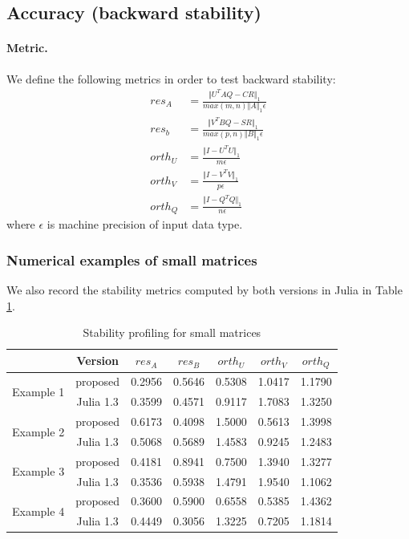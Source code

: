     \subsection{Accuracy (backward stability)}
    \paragraph{Metric.}
    We define the following metrics in order to test backward stability:
    \begin{align} 
        res_A &= \frac{\Vert U^TAQ - CR\Vert_1}{max(m,n)\Vert A \Vert_1 \epsilon}  \\[0.8em]  \label{backward_error_1}
        res_b &= \frac{\Vert V^TBQ - SR\Vert_1}{max(p,n)\Vert B \Vert_1 \epsilon}  \\[0.8em]  
        orth_U &= \frac{\Vert I - U^TU\Vert_1}{m \epsilon} \\[0.8em]  
        orth_V &= \frac{\Vert I - V^TV\Vert_1}{p \epsilon} \\[0.8em]  
        orth_Q &= \frac{\Vert I - Q^TQ\Vert_1}{n \epsilon} \label{backward_error_5}
    \end{align}
    where $\epsilon$ is machine precision of input data type.
    
    \subsubsection{Numerical examples of small matrices}

    We also record the stability metrics computed by both versions in Julia in Table \ref{tab:sta_test_1}.
        \begin{table}[H]
        \centering
        \begin{tabular}{||c | c || c | c | c | c | c||} 
         \hline
         & Version & $res_A$ & $res_B$ & $orth_U$ & $orth_V$ & $orth_Q$ \\ [0.5ex] 
         \hline\hline
         \multirow{2}{5em}{Example 1} & proposed & 0.2956 & 0.5646 & 0.5308 & 1.0417 & 1.1790 \\ 
         & Julia 1.3 & 0.3599 & 0.4571 & 0.9117 & 1.7083 & 1.3250 \\
        \hline\hline
        \multirow{2}{5em}{Example 2} & proposed & 0.6173 & 0.4098 & 1.5000 & 0.5613 & 1.3998 \\ 
         & Julia 1.3 & 0.5068 & 0.5689 & 1.4583 & 0.9245 & 1.2483 \\
        \hline\hline
        \multirow{2}{5em}{Example 3} & proposed & 0.4181 & 0.8941 & 0.7500 & 1.3940 & 1.3277 \\ 
         & Julia 1.3 & 0.3536 & 0.5938 & 1.4791 & 1.9540 & 1.1062\\
        \hline\hline
        \multirow{2}{5em}{Example 4} & proposed & 0.3600 & 0.5900 & 0.6558 & 0.5385 & 1.4362 \\ 
         & Julia 1.3 & 0.4449 & 0.3056 & 1.3225 & 0.7205 & 1.1814 \\
        \hline\hline
        \end{tabular}
        \caption{Stability profiling for small matrices}
        \label{tab:sta_test_1}
        \end{table}
        
